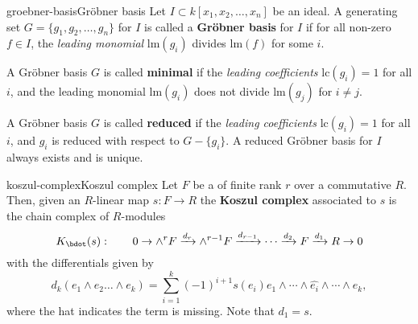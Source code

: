 \begin{topic}{groebner-basis}{Gröbner basis}
    Let $I \subset k[x_1, x_2, \ldots, x_n]$ be an ideal. A generating set $G = \{ g_1, g_2, \ldots, g_n \}$ for $I$ is called a \textbf{Gröbner basis} for $I$ if for all non-zero $f \in I$, the \textit{leading monomial} $\text{lm}(g_i)$ divides $\text{lm}(f)$ for some $i$.
    
    A Gröbner basis $G$ is called \textbf{minimal} if the \textit{leading coefficients} $\text{lc}(g_i) = 1$ for all $i$, and the leading monomial $\text{lm}(g_i)$ does not divide $\text{lm}(g_j)$ for $i \ne j$.
    
    A Gröbner basis $G$ is called \textbf{reduced} if the \textit{leading coefficients} $\text{lc}(g_i) = 1$ for all $i$, and $g_i$ is reduced with respect to $G - \{ g_i \}$. A reduced Gröbner basis for $I$ always exists and is unique.
\end{topic}

\begin{topic}{koszul-complex}{Koszul complex}
    Let $F$ be a  of finite rank $r$ over a commutative  $R$. Then, given an $R$-linear map $s : F \to R$ the \textbf{Koszul complex} associated to $s$ is the chain complex of $R$-modules
    \[ K_\bdot(s) : \qquad 0 \to \wedge^r F \xrightarrow{d_r} \wedge^{r - 1} F \xrightarrow{d_{r - 1}} \cdots \xrightarrow{d_2} F \xrightarrow{d_1} R \to 0 \]
    with the differentials given by
    \[ d_k(e_1 \wedge e_2 \ldots \wedge e_k) = \sum_{i = 1}^{k} (-1)^{i + 1} s(e_i) e_1 \wedge \cdots \wedge \hat{e_i} \wedge \cdots \wedge e_k , \]
    where the hat indicates the term is missing. Note that $d_1 = s$.
\end{topic}

